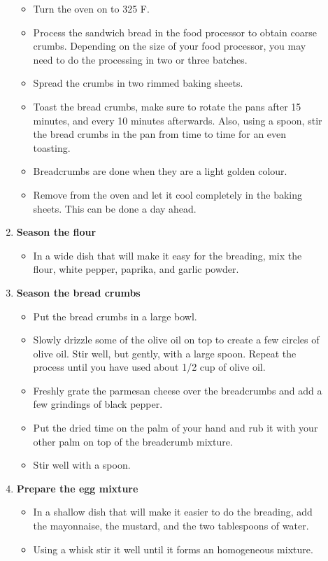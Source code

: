 \documentclass[11pt,letterpaper]{article}
\begin{document}
\begin{description}
\begin{enumerate}
	  \begin{itemize}
	  \item Turn the oven on to 325 F.
	  \item Process the sandwich bread in the food processor to obtain coarse crumbs. Depending on the size of your food processor, you may need to do the processing in two or three batches.
	  \item Spread the crumbs in two rimmed baking sheets.
	  \item Toast the bread crumbs, make sure to rotate the pans after 15 minutes, and every 10 minutes afterwards. Also, using a spoon, stir the bread crumbs in the pan from time to time for an even toasting.
	  \item Breadcrumbs are done when they are a light golden colour.
	  \item Remove from the oven and let it cool completely in the baking sheets. This can be done a day ahead.
	 \end{itemize}
	\item {\bf Season the flour}
	\begin{itemize}
	\item In a wide dish that will make it easy for the breading, mix the flour, white pepper, paprika, and garlic powder.
	\end{itemize}
	\item {\bf Season the bread crumbs}
	\begin{itemize}
	\item Put the bread crumbs in a large bowl.
	\item Slowly drizzle some of the olive oil on top to create a few circles of olive oil. Stir well, but gently, with a large spoon. Repeat the process until you have used about 1/2 cup of olive oil.	
	\item Freshly grate the parmesan cheese over the breadcrumbs and add a few grindings of black pepper.
	\item Put the dried time on the palm of your hand and rub it with your other palm on top of the breadcrumb mixture.
	\item Stir well with a spoon.
	\end{itemize}
	\item {\bf Prepare the egg mixture}
	\begin{itemize}
	\item In a shallow dish that will make it easier to do the breading, add the mayonnaise, the mustard, and the two tablespoons of water.
	\item Using a whisk stir it well until it forms an homogeneous mixture.

\end{itemize}
\end{enumerate}
\end{description}
\end{document}
